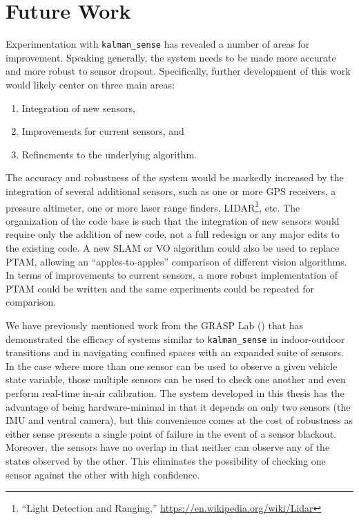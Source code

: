 \chapter{Future Work}

Experimentation with \texttt{kalman\_sense} has revealed a number of areas for improvement. Speaking generally, the system needs to be made more accurate and more robust to sensor dropout. Specifically, further development of this work would likely center on three main areas:
\begin{enumerate}
\item Integration of new sensors,
\item Improvements for current sensors, and
\item Refinements to the underlying algorithm.
\end{enumerate}
The accuracy and robustness of the system would be markedly increased by the integration of several additional sensors, such as one or more GPS receivers, a pressure altimeter, one or more laser range finders, LIDAR\footnote{``Light Detection and Ranging,'' \url{https://en.wikipedia.org/wiki/Lidar}}, etc. The organization of the code base is such that the integration of new sensors would require only the addition of new code, not a full redesign or any major edits to the existing code. A new SLAM or VO algorithm could also be used to replace PTAM, allowing an ``apples-to-apples'' comparison of different vision algorithms. In terms of improvements to current sensors, a more robust implementation of PTAM could be written and the same experiments could be repeated for comparison.

We have previously mentioned work from the GRASP Lab (\cite{Shen2011}) that has demonstrated the efficacy of systems similar to \texttt{kalman\_sense} in indoor-outdoor transitions and in navigating confined spaces with an expanded suite of sensors. In the case where more than one sensor can be used to observe a given vehicle state variable, those multiple sensors can be used to check one another and even perform real-time in-air calibration. The system developed in this thesis has the advantage of being hardware-minimal in that it depends on only two sensors (the IMU and ventral camera), but this convenience comes at the cost of robustness as either sense presents a single point of failure in the event of a sensor blackout. Moreover, the sensors have no overlap in that neither can observe any of the states observed by the other. This eliminates the possibility of checking one sensor against the other with high confidence.




